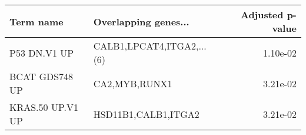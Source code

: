 \begin{tabular}{llr}
\toprule
       Term name &      Overlapping genes... &  Adjusted p-value \\
\midrule
    P53 DN.V1 UP & CALB1,LPCAT4,ITGA2,...(6) &          1.10e-02 \\
  BCAT GDS748 UP &             CA2,MYB,RUNX1 &          3.21e-02 \\
KRAS.50 UP.V1 UP &       HSD11B1,CALB1,ITGA2 &          3.21e-02 \\
\bottomrule
\end{tabular}
